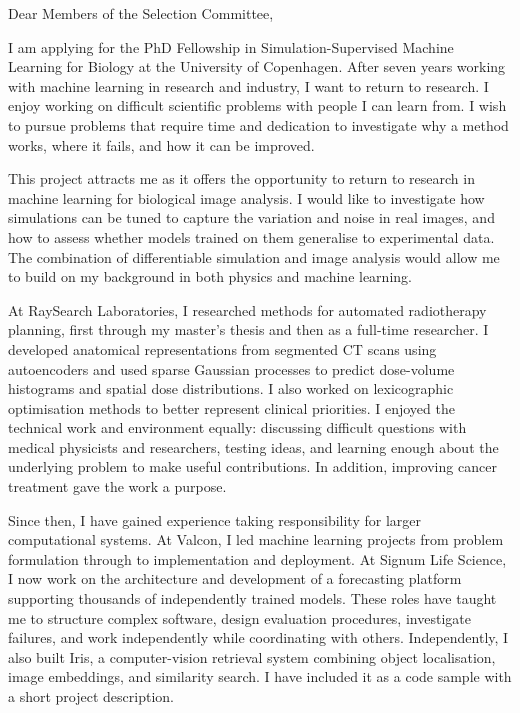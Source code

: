 \documentclass[11pt,a4paper]{moderncv}
\begin{document}
\makecvtitle
Dear Members of the Selection Committee,

\vspace*{2em}
I am applying for the PhD Fellowship in Simulation-Supervised Machine Learning for Biology at the University of Copenhagen. After seven years working with machine learning in research and industry, I want to return to research. I enjoy working on difficult scientific problems with people I can learn from. I wish to pursue problems that require time and dedication to investigate why a method works, where it fails, and how it can be improved. 

\vspace{4pt}
\hspace*{2em}
This project attracts me as it offers the opportunity to return to research in machine learning for biological image analysis. I would like to investigate how simulations can be tuned to capture the variation and noise in real images, and how to assess whether models trained on them generalise to experimental data. The combination of differentiable simulation and image analysis would allow me to build on my background in both physics and machine learning.

\vspace{4pt}
\hspace*{2em}
At RaySearch Laboratories, I researched methods for automated radiotherapy planning, first through my master's thesis and then as a full-time researcher. I developed anatomical representations from segmented CT scans using autoencoders and used sparse Gaussian processes to predict dose-volume histograms and spatial dose distributions. I also worked on lexicographic optimisation methods to better represent clinical priorities. I enjoyed the technical work and environment equally: discussing difficult questions with medical physicists and researchers, testing ideas, and learning enough about the underlying problem to make useful contributions. In addition, improving cancer treatment gave the work a purpose.

\vspace{4pt}
\hspace*{2em}
Since then, I have gained experience taking responsibility for larger computational systems. At Valcon, I led machine learning projects from problem formulation through to implementation and deployment. At Signum Life Science, I now work on the architecture and development of a forecasting platform supporting thousands of independently trained models. These roles have taught me to structure complex software, design evaluation procedures, investigate failures, and work independently while coordinating with others. Independently, I also built Iris, a computer-vision retrieval system combining object localisation, image embeddings, and similarity search. I have included it as a code sample with a short project description.
\end{document}
